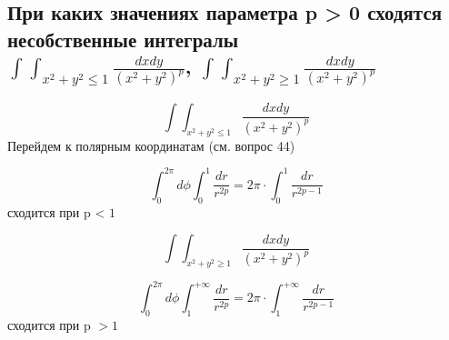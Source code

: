 

\subsection{При каких значениях параметра p > 0 сходятся несобственные интегралы\\ $\int\int_{x^2 + y^2 \leqslant 1}\frac{dxdy}{(x^2 + y^2)^p}$, $\int\int_{x^2 + y^2 \geqslant 1}\frac{dxdy}{(x^2 + y^2)^p}$}

\[\int\int_{x^2 + y^2 \leqslant 1}\frac{dxdy}{(x^2 + y^2)^p}\]
Перейдем к полярным координатам (см. вопрос 44)

\[\int_{0}^{2\pi}d\phi\int_{0}^{1}\frac{dr}{r^{2p}} = 2\pi\cdot\int_{0}^{1}\frac{dr}{r^{2p - 1}}\]
сходится при p < $1$

\[\int\int_{x^2 + y^2 \geqslant 1}\frac{dxdy}{(x^2 + y^2)^p}\]

\[\int_{0}^{2\pi}d\phi\int_{1}^{+\infty}\frac{dr}{r^{2p}} = 2\pi\cdot\int_{1}^{+\infty}\frac{dr}{r^{2p-1}}\]
сходится при p $>1$

